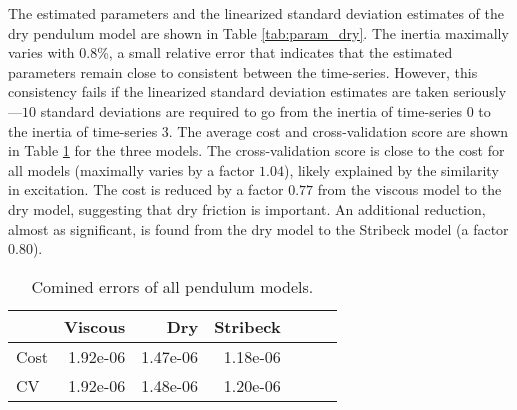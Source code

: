 \documentclass[preprint,12pt]{elsarticle}
\numberwithin{equation}{section}
\begin{document}
The estimated parameters and the linearized standard deviation estimates of the dry pendulum model are shown in Table \ref{tab:param_dry}.
The inertia maximally varies with 0.8\%, a small relative error that indicates that the estimated parameters remain close to consistent between the time-series.
However, this consistency fails if the linearized standard deviation estimates are taken seriously---$10$ standard deviations are required to go from the inertia of time-series 0 to the inertia of time-series 3.
The average cost and cross-validation score are shown in Table \ref{tab:pendulum_error} for the three models.
The cross-validation score is close to the cost for all models (maximally varies by a factor $1.04$), likely explained by the similarity in excitation.
The cost is reduced by a factor $0.77$ from the viscous model to the dry model, suggesting that dry friction is important.
An additional reduction, almost as significant, is found from the dry model to the Stribeck model (a factor $0.80$).

\begin{table}
\caption{
    Estimated parameters of the pendulum.
    Values in parenthesis are the standard deviation estimates to the same precision as the least significant digit.
    If the estimated parameter value is $0$, then the value in parenthesis is the standard deviation in absolute precision.
}
\label{tab:param_dry}
\end{table}
\begin{table}
\caption{Comined errors of all pendulum models.}
\label{tab:pendulum_error}
\centering
\begin{tabular}{l|rrrrr|r}
\toprule
{} & {Viscous} & {Dry} & {Stribeck} \\
\midrule
Cost &  1.92e-06 & 1.47e-06 & 1.18e-06  \\
CV &  1.92e-06 & 1.48e-06 & 1.20e-06  \\
\bottomrule
\end{tabular}
\end{table}
\end{document}
